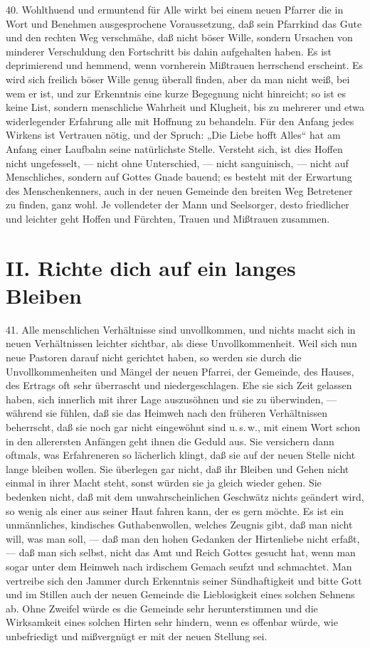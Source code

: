 40. Wohlthuend und ermuntend für Alle wirkt bei einem neuen Pfarrer die in Wort und Benehmen ausgesprochene Voraussetzung, daß sein Pfarrkind das
Gute und den rechten Weg verschmähe, daß nicht böser Wille, sondern Ursachen von minderer Verschuldung den Fortschritt bis dahin aufgehalten haben. Es ist deprimierend und hemmend, wenn vornherein Mißtrauen herrschend erscheint. Es wird sich freilich böser Wille genug überall finden, aber da man nicht weiß, bei wem er ist, und zur Erkenntnis eine kurze Begegnung nicht hinreicht; so ist es keine List, sondern menschliche Wahrheit und Klugheit, bis zu mehrerer und etwa widerlegender Erfahrung alle mit Hoffnung zu behandeln. Für den Anfang jedes Wirkens ist Vertrauen nötig, und der Spruch: „Die Liebe hofft Alles“ hat am Anfang einer Laufbahn seine natürlichste Stelle. Versteht sich, ist dies Hoffen nicht ungefesselt, — nicht ohne Unterschied, — nicht sanguinisch, — nicht auf Menschliches, sondern auf Gottes Gnade bauend; es besteht mit der Erwartung des Menschenkenners, auch in der neuen Gemeinde den breiten Weg Betretener zu finden, ganz wohl. Je vollendeter der Mann und Seelsorger, desto friedlicher und leichter geht Hoffen und Fürchten, Trauen und Mißtrauen zusammen.

\section{II. Richte dich auf ein langes Bleiben}

41. Alle menschlichen Verhältnisse sind unvollkommen, und nichts macht sich in neuen Verhältnissen leichter sichtbar, als diese Unvollkommenheit. Weil sich nun neue Pastoren darauf nicht gerichtet haben, so werden sie durch die Unvollkommenheiten und Mängel der neuen Pfarrei, der
Gemeinde, des Hauses, des Ertrags oft sehr überrascht und niedergeschlagen. Ehe sie sich Zeit gelassen haben, sich innerlich mit ihrer Lage auszusöhnen und sie zu überwinden, — während sie fühlen, daß sie das Heimweh nach den früheren Verhältnissen beherrscht, daß sie noch gar nicht eingewöhnt sind u.\,s.\,w., mit einem Wort schon in den allerersten Anfängen geht ihnen die Geduld aus. Sie versichern dann oftmals, was Erfahreneren so lächerlich klingt, daß sie auf der neuen Stelle nicht lange bleiben wollen. Sie überlegen gar nicht, daß ihr Bleiben und Gehen nicht einmal in ihrer Macht steht, sonst würden sie ja gleich wieder gehen. Sie bedenken nicht, daß mit dem unwahrscheinlichen Geschwätz nichts geändert wird, so wenig als einer aus seiner Haut fahren kann, der es gern möchte. Es ist ein unmännliches, kindisches Guthabenwollen, welches Zeugnis gibt, daß man nicht will, was man soll, — daß man den hohen Gedanken der Hirtenliebe nicht erfaßt, — daß man sich selbst, nicht das Amt und Reich Gottes gesucht hat, wenn man sogar unter dem Heimweh nach irdischem Gemach seufzt und schmachtet. Man vertreibe sich den Jammer durch Erkenntnis seiner Sündhaftigkeit und bitte Gott und im Stillen auch der neuen Gemeinde die Lieblosigkeit eines solchen Sehnens ab. Ohne Zweifel würde es die Gemeinde sehr herunterstimmen und die Wirksamkeit eines solchen Hirten sehr hindern, wenn es offenbar würde, wie unbefriedigt und mißvergnügt er mit der neuen Stellung sei.

